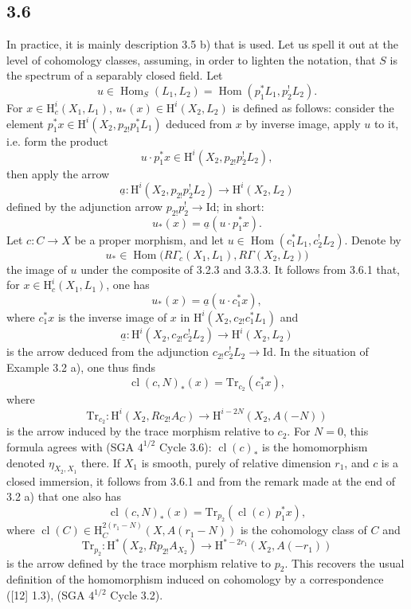 \documentclass[11pt]{article}
\renewcommand{\H}{\mathrm{H}}
\DeclareMathOperator{\Hom}{Hom}
\providecommand{\Id}{\mathrm{Id}}
\providecommand{\Hom}{\operatorname{Hom}}
\providecommand{\Hom}{\operatorname{Hom}}
\begin{document}
\subsection*{3.6}
In practice, it is mainly description 3.5 b) that is used. Let us spell it out at the level of cohomology classes, assuming, in order to lighten the notation, that $S$ is the spectrum of a separably closed field. Let
\[
u\in\Hom_S(L_1,L_2)=\Hom(p_1^*L_1,p_2^!L_2).
\]
For $x\in\H_c^i(X_1,L_1)$, $u_*(x)\in\H^i(X_2,L_2)$ is defined as follows: consider the element $p_1^*x\in\H^i(X_2,p_{2!}p_1^*L_1)$ deduced from $x$ by inverse image, apply $u$ to it, i.e. form the product
\[
u\cdot p_1^*x\in \H^i(X_2,p_{2!}p_2^!L_2),
\]
then apply the arrow
\[
\underline{a}:\H^i(X_2,p_{2!}p_2^!L_2)\longrightarrow \H^i(X_2,L_2)
\]
defined by the adjunction arrow $p_{2!}p_2^!\to\Id$; in short:
\begin{equation}
u_*(x)=\underline{a}(u\cdot p_1^*x).
\tag{3.6.1}
\end{equation}
Let $c:C\to X$ be a proper morphism, and let $u\in\Hom(c_1^*L_1,c_2^!L_2)$. Denote by
\[
u_*\in\Hom\bigl(R\Gamma_c(X_1,L_1),R\Gamma(X_2,L_2)\bigr)
\]
the image of $u$ under the composite of 3.2.3 and 3.3.3. It follows from 3.6.1 that, for $x\in\H_c^i(X_1,L_1)$, one has
\begin{equation}
u_*(x)=\underline{a}(u\cdot c_1^*x),
\tag{3.6.2}
\end{equation}
where $c_1^*x$ is the inverse image of $x$ in $\H^i(X_2,c_{2!}c_1^*L_1)$ and
\[
\underline{a}:\H^i(X_2,c_{2!}c_2^!L_2)\longrightarrow \H^i(X_2,L_2)
\]
is the arrow deduced from the adjunction $c_{2!}c_2^!L_2\to\Id$. In the situation of Example 3.2 a), one thus finds
\begin{equation}
\operatorname{cl}(c,N)_*(x)=\mathrm{Tr}_{c_2}(c_1^*x),
\tag{3.6.3}
\end{equation}
where
\[
\mathrm{Tr}_{c_2}:\H^i(X_2,Rc_{2!}A_C)\longrightarrow\H^{i-2N}(X_2,A(-N))
\]
is the arrow induced by the trace morphism relative to $c_2$. For $N=0$, this formula agrees with (SGA $4^{1/2}$ Cycle 3.6): $\operatorname{cl}(c)_*$ is the homomorphism denoted $\eta_{X_2,X_1}$ there. If $X_1$ is smooth, purely of relative dimension $r_1$, and $c$ is a closed immersion, it follows from 3.6.1 and from the remark made at the end of 3.2 a) that one also has
\begin{equation}
\operatorname{cl}(c,N)_*(x)=\mathrm{Tr}_{p_2}(\operatorname{cl}(c)\,p_1^*x),
\tag{3.6.4}
\end{equation}
where $\operatorname{cl}(C)\in \H_C^{2(r_1-N)}(X,A(r_1-N))$ is the cohomology class of $C$ and
\[
\mathrm{Tr}_{p_2}:\H^*(X_2,Rp_{2!}A_{X_2})\longrightarrow \H^{*-2r_1}(X_2,A(-r_1))
\]
is the arrow defined by the trace morphism relative to $p_2$. This recovers the usual definition of the homomorphism induced on cohomology by a correspondence ([12] 1.3), (SGA $4^{1/2}$ Cycle 3.2).
\end{document}

